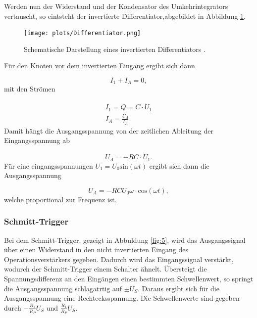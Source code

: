 Werden nun der Widerstand und der Kondensator des Umkehrintegrators vertauscht, so eintsteht der invertierte Differentiator,abgebildet in Abbildung \ref{fig:4}.

\begin{figure}
    \centering
        \texttt{[image: plots/Differentiator.png]}
    \caption{Schematische Darstellung eines invertierten Differentiators \cite{Anleitung}.}
    \label{fig:4}
\end{figure}

Für den Knoten vor dem invertierten Eingang ergibt sich dann

\begin{equation*}
    I_1 + I_A = 0,
\end{equation*}
mit den Strömen

\begin{align*}
    I_1 = \dot Q = C \cdot \dot U_1 \\
    I_A = \frac{U_A}{I_A}.
\end{align*}
Damit hängt die Ausgangsspannung von der zeitlichen Ableitung der Eingangsspannung ab

\begin{equation*}
    U_A = -R C \cdot \dot U_1.
\end{equation*}
Für eine eingangsspannungen $U_1 = U_0 \text{sin} (\omega t)$ ergibt sich dann die Ausgangsspannung 

\begin{equation}
    U_A = -RC U_0 \omega \cdot \text{cos} (\omega t),
\end{equation}
welche proportional zur Frequenz ist.



\subsubsection{Schmitt-Trigger}
\label{sec:Schmitt-Trigger}


Bei dem Schmitt-Trigger, gezeigt in Abbuldung \ref{fig:5}, wird das Ausgangssignal über einen Widerstand in den nicht invertierten Eingang des Operationsverstärkers gegeben.
Dadurch wird das Eingangssignal verstärkt, wodurch der Schmitt-Trigger einem Schalter ähnelt.
Übersteigt die Spannungsdifferenz an den Eingängen einen bestimmten Schwellenwert, so springt die Ausgangsspannung schlagatrtig auf $\pm U_S$.
Daraus ergibt sich für die Ausgangsspannung eine Rechtecksspannung.
Die Schwellenwerte sind gegeben durch $- \frac{R_1}{R_P} U_S$ und $\frac{R_1}{R_P} U_S$.

